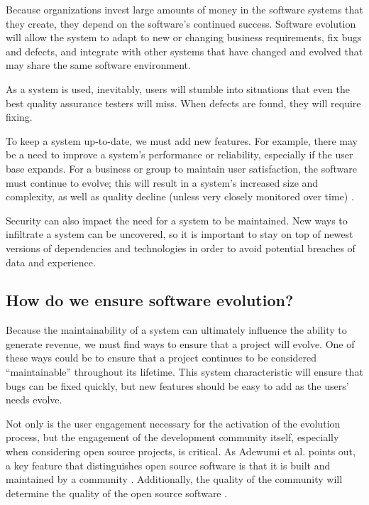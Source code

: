 Because organizations invest large amounts of money in the software systems that they create, they depend on the software's continued success. Software evolution will allow the system to adapt to new or changing business requirements, fix bugs and defects, and integrate with other systems that have changed and evolved that may share the same software environment.

As a system is used, inevitably, users will stumble into situations that even the best quality assurance testers will miss. When defects are found, they will require fixing. 

To keep a system up-to-date, we must add new features. For example, there may be a need to improve a system's performance or reliability, especially if the user base expands. For a business or group to maintain user satisfaction, the software must continue to evolve; this will result in a system's increased size and complexity, as well as quality decline (unless very closely monitored over time) \cite{yu:2013}.

Security can also impact the need for a system to be maintained. New ways to infiltrate a system can be uncovered, so it is important to stay on top of newest versions of dependencies and technologies in order to avoid potential breaches of data and experience.

\subsection{How do we ensure software evolution?} \label{subEnsureEvolution}

Because the maintainability of a system can ultimately influence the ability to generate revenue, we must find ways to ensure that a project will evolve. One of these ways could be to ensure that a project continues to be considered ``maintainable'' throughout its lifetime. This system characteristic will ensure that bugs can be fixed quickly, but new features should be easy to add as the users' needs evolve.

Not only is the user engagement necessary for the activation of the evolution process, but the engagement of the development community itself, especially when considering open source projects, is critical. As Adewumi et al. points out, a key feature that distinguishes open source software is that it is built and maintained by a community \cite{haaland:2010}. Additionally, the quality of the community will determine the quality of the open source software \cite{samoladas:2008}.
